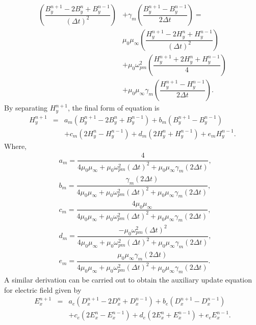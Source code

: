 \begin{equation}
\begin{split}
\left(\dfrac{B^{n+1}_y-2B^n_y+B^{n-1}_y}{(\Delta t)^2}\right)&+\gamma_m\left(\dfrac{B^{n+1}_y-B^{n-1}_y}{2\Delta t}\right) =\\
&\mu_0\mu_\infty\left(\dfrac{H^{n+1}_y-2H^n_y+H^{n-1}_y}{(\Delta t)^2}\right)\\
&+\mu_0\omega^2_{pm}\left(\dfrac{H^{n+1}_y+2H^n_y+H^{n-1}_y}{4}\right)\\
&+\mu_0\mu_\infty \gamma_m\left(\dfrac{H^{n+1}_y-H^{n-1}_y}{2\Delta t}\right).
\end{split}
\label{2nd-order-B-H}
\end{equation}
By separating $H^{n+1}_y$, the final form of equation is
\begin{eqnarray}
\nonumber H^{n+1}_y &=& a_m\left(B^{n+1}_y-2B^n_y+B^{n-1}_y\right)+b_m\left(B^{n+1}_y-B^{n-1}_y\right)\\
&&+c_m\left(2H^n_y-H^{n-1}_y\right)+d_m\left(2H^n_y+H^{n-1}_y\right)+e_m H^{n-1}_y.
\label{2nd-order-B-H-final-form}
\end{eqnarray}
Where,
\begin{eqnarray}
\nonumber & a_m=\dfrac{4}{4\mu_0\mu_\infty+\mu_0\omega^2_{pm}\left(\Delta t\right)^2+\mu_0\mu_\infty \gamma_m \left(2\Delta t\right)},\\
\nonumber & b_m=\dfrac{\gamma_m\left(2\Delta t\right)}{4\mu_0\mu_\infty+\mu_0\omega^2_{pm}\left(\Delta t\right)^2+\mu_0\mu_\infty \gamma_m \left(2\Delta t\right)},\\
\nonumber & c_m=\dfrac{4\mu_0\mu_\infty}{4\mu_0\mu_\infty+\mu_0\omega^2_{pm}\left(\Delta t\right)^2+\mu_0\mu_\infty \gamma_m \left(2\Delta t\right)},\\
\nonumber & d_m=\dfrac{-\mu_0\omega^2_{pm}\left(\Delta t\right)^2}{4\mu_0\mu_\infty+\mu_0\omega^2_{pm}\left(\Delta t\right)^2+\mu_0\mu_\infty \gamma_m \left(2\Delta t\right)},\\
\nonumber & e_m=\dfrac{\mu_0\mu_\infty \gamma_m\left(2\Delta t\right)}{4\mu_0\mu_\infty+\mu_0\omega^2_{pm}\left(\Delta t\right)^2+\mu_0\mu_\infty \gamma_m \left(2\Delta t\right)}.
\label{1D-Drude-H-scalars}
\end{eqnarray}
A similar derivation can be carried out to obtain the auxiliary update equation for electric field given by
\begin{eqnarray}
\nonumber E^{n+1}_x &=& a_e\left(D^{n+1}_x-2D^n_x+D^{n-1}_x\right)+b_e\left(D^{n+1}_x-D^{n-1}_x\right)\\
&&+c_e\left(2E^n_x-E^{n-1}_x\right)+d_e\left(2E^n_x+E^{n-1}_x\right)+e_e E^{n-1}_x.
\label{2nd-order-D-E-final-form}
\end{eqnarray}
